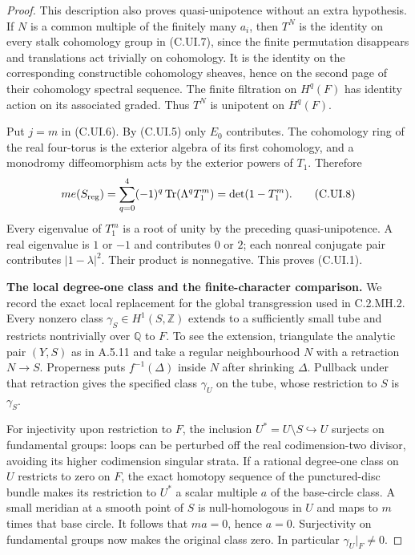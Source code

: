 \begin{proof}
This description also proves quasi-unipotence without
an extra hypothesis. If $N$ is a common multiple of
the finitely many $a_i$, then $T^N$ is the identity
on every stalk cohomology group in (C.UI.7), since
the finite permutation disappears and translations
act trivially on cohomology. It is the identity on
the corresponding constructible cohomology sheaves,
hence on the second page of their cohomology spectral
sequence. The finite filtration on $H^q(F)$ has
identity action on its associated graded. Thus
$T^N$ is unipotent on $H^q(F)$.

Put $j=m$ in (C.UI.6). By (C.UI.5) only $E_0$
contributes. The cohomology ring of the real
four-torus is the exterior algebra of its first
cohomology, and a monodromy diffeomorphism acts by
the exterior powers of $T_1$. Therefore
\[
 m e(S_{\rm reg})
   =\sum_{q=0}^4(-1)^q\operatorname{Tr}(\Lambda^qT_1^m)
   =\det(1-T_1^m).
 \tag{C.UI.8}
\]
Every eigenvalue of $T_1^m$ is a root of unity by
the preceding quasi-unipotence. A real eigenvalue
is $1$ or $-1$ and contributes $0$ or $2$; each
nonreal conjugate pair contributes $|1-\lambda|^2$.
Their product is nonnegative. This proves (C.UI.1).

\par\medskip\noindent\textbf{The local degree-one class and the finite-character comparison.}\quad
We record the exact local replacement for the global
transgression used in C.2.MH.2. Every nonzero class
$\gamma_S\in H^1(S,\mathbb Z)$ extends to a sufficiently
small tube and restricts nontrivially over $\mathbb Q$
to $F$. To see the extension, triangulate the analytic
pair $(Y,S)$ as in A.5.11 and take a regular
neighbourhood $N$ with a retraction $N\to S$.
Properness puts $f^{-1}(\Delta)$ inside $N$ after
shrinking $\Delta$. Pullback under that retraction
gives the specified class $\gamma_U$ on the tube,
whose restriction to $S$ is $\gamma_S$.

For injectivity upon restriction to $F$, the inclusion
$U^*=U\setminus S\hookrightarrow U$ surjects on
fundamental groups: loops can be perturbed off the
real codimension-two divisor, avoiding its higher
codimension singular strata. If a rational
degree-one class on $U$ restricts to zero on $F$,
the exact homotopy sequence of the punctured-disc
bundle makes its restriction to $U^*$ a scalar
multiple $a$ of the base-circle class. A small
meridian at a smooth point of $S$ is null-homologous
in $U$ and maps to $m$ times that base circle.
It follows that $ma=0$, hence $a=0$. Surjectivity
on fundamental groups now makes the original
class zero. In particular $\gamma_U|_F\ne0$.


\end{proof}
